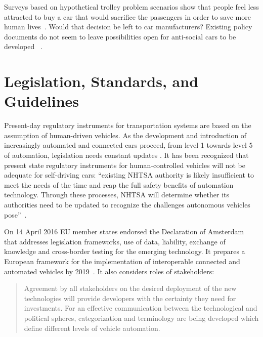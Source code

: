 Surveys based on hypothetical trolley problem scenarios show that people feel less attracted to buy a car that would sacrifice the passengers in order to save more human lives~\cite{Bonnefon2016}. Would that decision be left to car manufacturers? Existing policy documents do not seem to leave possibilities open for anti-social cars to be developed~ \cite{EthicsCommission2017pr,EthicsCommission2017b,Pillath2016,NHTSA2016PolicyUpdate,DBLP:journals/corr/CharisiDFLMSSWY17}.


\section{Legislation, Standards, and Guidelines}
\label{sec:LegislationStandardGuidelines}

Present-day regulatory instruments for transportation systems are based on the assumption of human-driven vehicles. As the development and introduction of increasingly automated and connected cars proceed, from level 1 towards level 5 of automation, legislation needs constant updates \cite{EthicsCommission2017pr,EthicsCommission2017b,Pillath2016,NHTSA2016PolicyUpdate}. It has been recognized that present state regulatory instruments for human-controlled vehicles will not be adequate for self-driving cars:  \enquote{existing NHTSA authority is likely insufficient to meet the needs of the time and reap the full safety benefits of automation technology. Through these processes, NHTSA will determine whether its authorities need to be updated to recognize the challenges autonomous vehicles pose}~\cite{NHTSA2016PolicyUpdate}. %

On 14 April 2016 EU member states endorsed the Declaration of Amsterdam \cite{GovernmentNL2017} that addresses legislation frameworks, use of data, liability, exchange of knowledge and cross-border testing for the emerging technology. It prepares a European framework for the implementation of interoperable connected and automated vehicles by 2019~\cite{EthicsCommission2017b}. It also considers roles of stakeholders:

 \begin{quote}
 Agreement by all stakeholders on the desired deployment of the new technologies will provide developers with the certainty they need for investments. For an effective communication between the technological and political spheres, categorization and terminology are being developed which define different levels of vehicle automation. \cite{Pillath2016} %
 \end{quote} %
 
